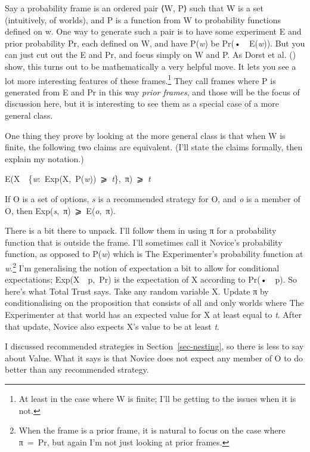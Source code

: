 \documentclass[
  11pt,
  letterpaper,
  DIV=11,
  numbers=noendperiod,
  twoside]{scrartcl}
\providecommand{\tightlist}{%
  \setlength{\itemsep}{0pt}\setlength{\parskip}{0pt}}
\begin{document}
Say a probability frame is an ordered pair ⟨W, P⟩ such that W is a set
(intuitively, of worlds), and P is a function from W to probability
functions defined on w. One way to generate such a pair is to have some
experiment E and prior probability Pr, each defined on W, and have
P(\emph{w}) be Pr(•~\textbar~E(\emph{w})). But you can just cut out the
E and Pr, and focus simply on W and P. As Dorst et al.
() show, this turns out to be
mathematically a very helpful move. It lets you see a lot more
interesting features of these frames.\footnote{At least in the case
  where W is finite; I'll be getting to the issues when it is not.} They
call frames where P is generated from E and Pr in this way \emph{prior
frames}, and those will be the focus of discussion here, but it is
interesting to see them as a special case of a more general class.

One thing they prove by looking at the more general class is that when W
is finite, the following two claims are equivalent. (I'll state the
claims formally, then explain my notation.)

\begin{description}
\tightlist
\item[Total Trust]
E(X~\textbar~\{\emph{w}:~Exp(X,~P(\emph{w}))~⩾~\emph{t}\},~π)~⩾~\emph{t}
\item[Value]
If O is a set of options, \emph{s} is a recommended strategy for O, and
\emph{o} is a member of O, then Exp(\emph{s},~π)~⩾~E(\emph{o},~π).
\end{description}

There is a bit there to unpack. I'll follow them in using π for a
probability function that is outside the frame. I'll sometimes call it
Novice's probability function, as opposed to P(\emph{w}) which is The
Experimenter's probability function at \emph{w}.\footnote{When the frame
  is a prior frame, it is natural to focus on the case where π~=~Pr, but
  again I'm not just looking at prior frames.} I'm generalising the
notion of expectation a bit to allow for conditional expectations;
Exp(X~\textbar~p,~Pr) is the expectation of X according to
Pr(•~\textbar~p). So here's what Total Trust says. Take any random
variable X. Update π by conditionalising on the proposition that
consists of all and only worlds where The Experimenter at that world has
an expected value for X at least equal to \emph{t}. After that update,
Novice also expects X's value to be at least \emph{t}.

I discussed recommended strategies in Section~\ref{sec-nesting}, so
there is less to say about Value. What it says is that Novice does not
expect any member of O to do better than any recommended strategy.
\end{document}

